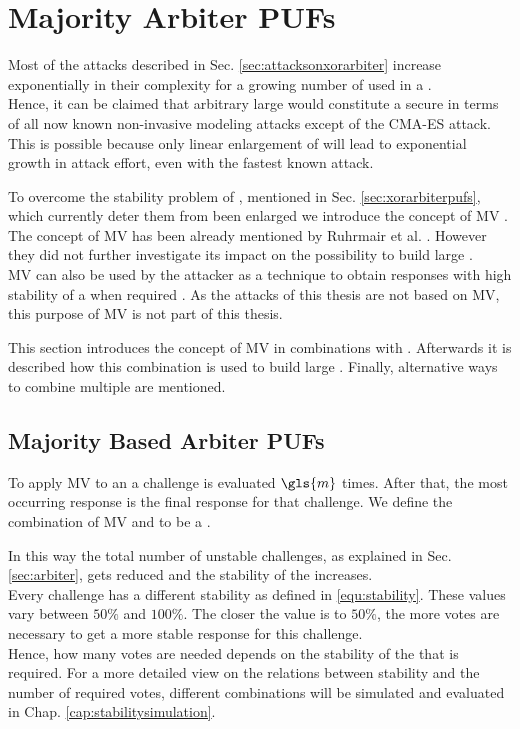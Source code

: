 \chapter{Majority Arbiter PUFs}
\label{cap:majorityarbiter}

Most of the attacks described in Sec. \ref{sec:attacksonxorarbiter} increase exponentially in their complexity for a growing number of used \apufs in a \xpuf. \\
Hence, it can be claimed that arbitrary large \xpufs would constitute a secure \puf in terms of all now known non-invasive modeling attacks except of the \ac{CMA-ES} attack.
This is possible because only linear enlargement of \xpufs will lead to exponential growth in attack effort, even with the fastest known attack.

To overcome the stability problem of \xpufs, mentioned in Sec. \ref{sec:xorarbiterpufs}, which currently deter them from been enlarged we introduce the concept of \ac{MV} \cite{Majzoobi2010FPGALines}.\\
The concept of \ac{MV} has been already mentioned by Ruhrmair et al. \cite{Ruhrmair2013PUFData}.
However they did not further investigate its impact on the possibility to build large \xpufs.\\
\ac{MV} can also be used by the attacker as a technique to obtain responses with high stability of a \puf when required \cite{Ganji2016PACPUFs, Ozturk2008TowardsDevices}.
As the attacks of this thesis are not based on \ac{MV}, this purpose of \ac{MV} is not part of this thesis.

This section introduces the concept of \ac{MV} in combinations with \apufs.
Afterwards it is described how this combination is used to build large \xpufs.
Finally, alternative ways to combine multiple \apufs are mentioned.

\section{Majority Based Arbiter PUFs}
\label{sec:majorityarbiter}

To apply \ac{MV} to an \apuf a challenge is evaluated $\gls{m}$ times.
After that, the most occurring response is the final response for that challenge.
We define the combination of \ac{MV} and \apuf to be a \mpuf.

In this way the total number of unstable challenges, as explained in Sec. \ref{sec:arbiter}, gets reduced and the stability of the \apuf increases.\\
Every challenge has a different stability as defined in \ref{equ:stability}.%
These values vary between $50 \%$ and $100 \%$.
The closer the value is to $50 \%$, the more votes are necessary to get a more stable response for this challenge.\\
Hence, how many votes are needed depends on the stability of the \apuf that is required. 
For a more detailed view on the relations between stability and the number of required votes, different combinations will be simulated and evaluated in Chap. \ref{cap:stabilitysimulation}.


